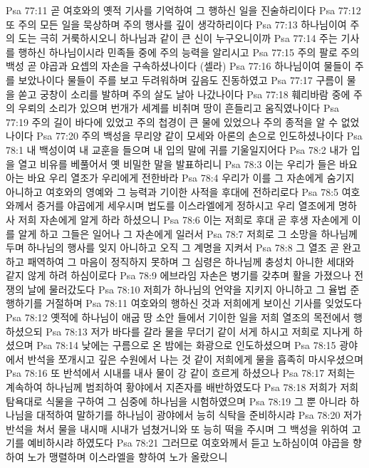 Psa 77:11  곧 여호와의 옛적 기사를 기억하여 그 행하신 일을 진술하리이다
Psa 77:12  또 주의 모든 일을 묵상하며 주의 행사를 깊이 생각하리이다
Psa 77:13  하나님이여 주의 도는 극히 거룩하시오니 하나님과 같이 큰 신이 누구오니이까
Psa 77:14  주는 기사를 행하신 하나님이시라 민족들 중에 주의 능력을 알리시고
Psa 77:15  주의 팔로 주의 백성 곧 야곱과 요셉의 자손을 구속하셨나이다 (셀라)
Psa 77:16  하나님이여 물들이 주를 보았나이다 물들이 주를 보고 두려워하며 깊음도 진동하였고
Psa 77:17  구름이 물을 쏟고 궁창이 소리를 발하며 주의 살도 날아 나갔나이다
Psa 77:18  훼리바람 중에 주의 우뢰의 소리가 있으며 번개가 세계를 비취며 땅이 흔들리고 움직였나이다
Psa 77:19  주의 길이 바다에 있었고 주의 첩경이 큰 물에 있었으나 주의 종적을 알 수 없었나이다
Psa 77:20  주의 백성을 무리양 같이 모세와 아론의 손으로 인도하셨나이다
Psa 78:1  내 백성이여 내 교훈을 들으며 내 입의 말에 귀를 기울일지어다
Psa 78:2  내가 입을 열고 비유를 베풀어서 옛 비밀한 말을 발표하리니
Psa 78:3  이는 우리가 들은 바요 아는 바요 우리 열조가 우리에게 전한바라
Psa 78:4  우리가 이를 그 자손에게 숨기지 아니하고 여호와의 영예와 그 능력과 기이한 사적을 후대에 전하리로다
Psa 78:5  여호와께서 증거를 야곱에게 세우시며 법도를 이스라엘에게 정하시고 우리 열조에게 명하사 저희 자손에게 알게 하라 하셨으니
Psa 78:6  이는 저희로 후대 곧 후생 자손에게 이를 알게 하고 그들은 일어나 그 자손에게 일러서
Psa 78:7  저희로 그 소망을 하나님께 두며 하나님의 행사를 잊지 아니하고 오직 그 계명을 지켜서
Psa 78:8  그 열조 곧 완고하고 패역하여 그 마음이 정직하지 못하며 그 심령은 하나님께 충성치 아니한 세대와 같지 않게 하려 하심이로다
Psa 78:9  에브라임 자손은 병기를 갖추며 활을 가졌으나 전쟁의 날에 물러갔도다
Psa 78:10  저희가 하나님의 언약을 지키지 아니하고 그 율법 준행하기를 거절하며
Psa 78:11  여호와의 행하신 것과 저희에게 보이신 기사를 잊었도다
Psa 78:12  옛적에 하나님이 애굽 땅 소안 들에서 기이한 일을 저희 열조의 목전에서 행하셨으되
Psa 78:13  저가 바다를 갈라 물을 무더기 같이 서게 하시고 저희로 지나게 하셨으며
Psa 78:14  낮에는 구름으로 온 밤에는 화광으로 인도하셨으며
Psa 78:15  광야에서 반석을 쪼개시고 깊은 수원에서 나는 것 같이 저희에게 물을 흡족히 마시우셨으며
Psa 78:16  또 반석에서 시내를 내사 물이 강 같이 흐르게 하셨으나
Psa 78:17  저희는 계속하여 하나님께 범죄하여 황야에서 지존자를 배반하였도다
Psa 78:18  저희가 저희 탐욕대로 식물을 구하여 그 심중에 하나님을 시험하였으며
Psa 78:19  그 뿐 아니라 하나님을 대적하여 말하기를 하나님이 광야에서 능히 식탁을 준비하시랴
Psa 78:20  저가 반석을 쳐서 물을 내시매 시내가 넘쳤거니와 또 능히 떡을 주시며 그 백성을 위하여 고기를 예비하시랴 하였도다
Psa 78:21  그러므로 여호와께서 듣고 노하심이여 야곱을 향하여 노가 맹렬하며 이스라엘을 향하여 노가 올랐으니
